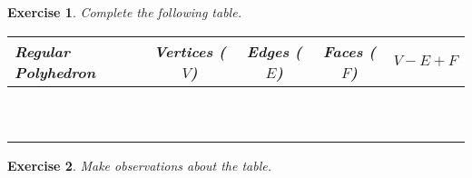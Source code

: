 \documentclass[12pt]{article}
\theoremstyle{plain}
\newtheorem{ex}{Exercise}
\begin{document}
\begin{ex}
  Complete the following table.
  \Large
    \begin{center}
      \begin{tabular}{|| l | c | c | c | c ||}
        \hline\hline
        Regular Polyhedron & Vertices ($V$) & Edges ($E$) & Faces ($F$) & $V-E+F$ \\ \hline
                           &                &             &             &         \\ \hline
                           &                &             &             &         \\ \hline
                           &                &             &             &         \\ \hline
                           &                &             &             &         \\ \hline
                           &                &             &             &         \\ \hline
                           &                &             &             &         \\ \hline
                           &                &             &             &         \\ \hline
                           &                &             &             &         \\ \hline
                           &                &             &             &         \\ \hline
                           &                &             &             &         \\ \hline\hline
      \end{tabular}
    \end{center}
  \normalsize 
\end{ex}

\begin{ex}
  Make observations about the table.
\end{ex}
\end{document}
